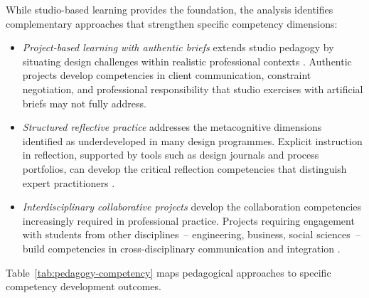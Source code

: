 \documentclass[ed]{acnsart}
\begin{document}
	While studio-based learning provides the foundation, the analysis identifies complementary approaches that strengthen specific competency dimensions:
	
	\begin{itemize}
		\item 
		
		\textit{Project-based learning with authentic briefs} extends studio pedagogy by situating design challenges within realistic professional contexts \cite{Kamalipour2022}. Authentic projects develop competencies in client communication, constraint negotiation, and professional responsibility that studio exercises with artificial briefs may not fully address.
		
		\item 
		
		\textit{Structured reflective practice} addresses the metacognitive dimensions identified as underdeveloped in many design programmes. Explicit instruction in reflection, supported by tools such as design journals and process portfolios, can develop the critical reflection competencies that distinguish expert practitioners \cite{Hameed2023310}.
		
		\item 
		
		\textit{Interdisciplinary collaborative projects} develop the collaboration competencies increasingly required in professional practice. Projects requiring engagement with students from other disciplines~-- engineering, business, social sciences~-- build competencies in cross-disciplinary communication and integration \cite{Chon2019187}.
	\end{itemize}
	
	Table~\ref{tab:pedagogy-competency} maps pedagogical approaches to specific competency development outcomes.
	
\end{document}
